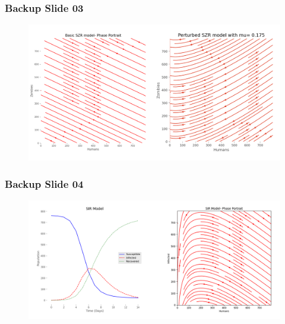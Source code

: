 \documentclass{beamer}
\begin{document}
\begin{frame}
\begin{adjustwidth}{-1.7em}{-1.5em}
\frametitle{Backup Slide 03}

\begin{figure}[H]
\centering
\includegraphics[scale=0.45]{special02.png}
\label{fig:backup03}
\end{figure}
\end{adjustwidth}
\end{frame}



\begin{frame}
\begin{adjustwidth}{-1.7em}{-1.5em}
\frametitle{Backup Slide 04}

\begin{figure}[H]
\centering
\includegraphics[scale=0.38]{special03.png}
\label{fig:backup04}
\end{figure}
\end{adjustwidth}
\end{frame}
\end{document}
